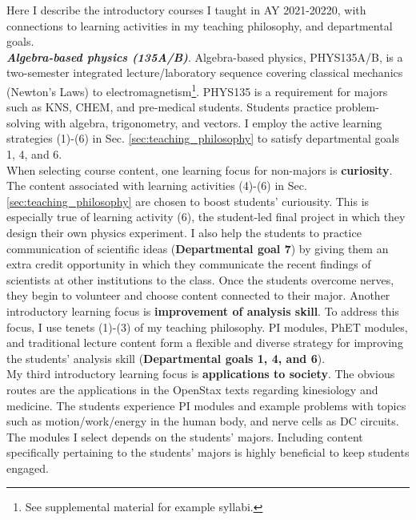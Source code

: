 \documentclass[../../../main.tex]{subfiles}
\begin{document}
\label{sec:intro_course_desc}

Here I describe the introductory courses I taught in AY 2021-20220, with connections to learning activities in my teaching philosophy, and departmental goals.
\\
\vspace{0.15cm}
\textbf{\textit{Algebra-based physics (135A/B)}}. Algebra-based physics, PHYS135A/B, is a two-semester integrated lecture/laboratory sequence covering classical mechanics (Newton's Laws) to electromagnetism\footnote{See supplemental material for example syllabi.}.  PHYS135 is a requirement for majors such as KNS, CHEM, and pre-medical students.  Students practice problem-solving with algebra, trigonometry, and vectors.  I employ the active learning strategies (1)-(6) in Sec. \ref{sec:teaching_philosophy} to satisfy departmental goals 1, 4, and 6.
\\
\vspace{0.15cm}
When selecting course content, one learning focus for non-majors is \textbf{curiosity}.  The content associated with learning activities (4)-(6) in Sec. \ref{sec:teaching_philosophy} are chosen to boost students' curiousity.  This is especially true of learning activity (6), the student-led final project in which they design their own physics experiment.  I also help the students to practice communication of scientific ideas (\textbf{Departmental goal 7}) by giving them an extra credit opportunity in which they communicate the recent findings of scientists at other institutions to the class.  Once the students overcome nerves, they begin to volunteer and choose content connected to their major.  Another introductory learning focus is \textbf{improvement of analysis skill}.  To address this focus, I use tenets (1)-(3) of my teaching philosophy.  PI modules, PhET modules, and traditional lecture content form a flexible and diverse strategy for improving the students' analysis skill (\textbf{Departmental goals 1, 4, and 6}).
\\
\vspace{0.15cm}
My third introductory learning focus is \textbf{applications to society}.  The obvious routes are the applications in the OpenStax texts \cite{openstax1} regarding kinesiology and medicine.  The students experience PI modules and example problems with topics such as motion/work/energy in the human body, and nerve cells as DC circuits.  The modules I select depends on the students' majors.  Including content specifically pertaining to the students' majors is highly beneficial to keep students engaged.
\end{document}
